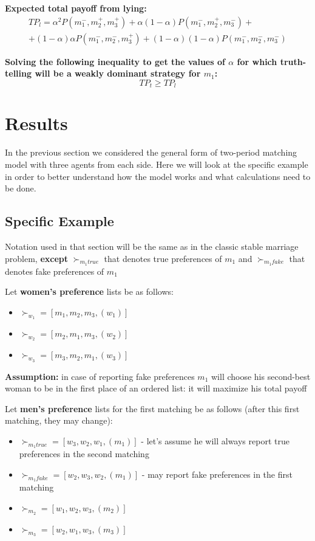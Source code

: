 \documentclass[a4paper]{article} %
\begin{document}
\hfill
\break
\textbf{Expected total payoff from lying:}
\begin{align}
   TP_l = \alpha ^ 2P(m_1^-,m_2^+,m_3^+) + \alpha(1-\alpha)P(m_1^-,m_2^+,m_3^-) + \\  +(1-\alpha)\alpha P(m_1^-,m_2^-,m_3^+) + (1-\alpha)(1-\alpha) P(m_1^-,m_2^-,m_3^-) 
\end{align}

\hfill
\break
\textbf{Solving the following inequality to get the values of $\alpha$ for which truth-telling will be a weakly dominant strategy for $m_1$:}
\[
TP_t \geq TP_l
\]








\section{Results}
In the previous section we considered the general form of two-period matching model with three agents from each side. Here we will look at the specific example in order to better understand how the model works and what calculations need to be done.






\subsection{Specific Example}

Notation used in that section will be the same as in the classic stable marriage problem, \textbf{except} ${\succ_{m_1 true}}$ that denotes true preferences of $m_1$
and ${\succ_{m_1 fake}}$ that denotes fake preferences of $m_1$

\hfill
\break
Let \textbf{women's preference} lists be as follows:
\begin{itemize}
    \item $\succ_{w_1} = [m_1, m_2, m_3, (w_1)]$
    \item $\succ_{w_2} = [m_2, m_1, m_3, (w_2)]$
    \item $\succ_{w_3} = [m_3, m_2, m_1, (w_3)]$
\end{itemize}

\hfill
\break
\textbf{Assumption:} in case of reporting fake preferences $m_1$ will choose his second-best woman to be in the first place of an ordered list: it will maximize his total payoff

\hfill
\break
Let \textbf{men's preference} lists for the first matching be as follows (after this first matching, they may change):
\begin{itemize}
    \item $\succ_{m_1 true} = [w_3, w_2, w_1, (m_1)]$ - let's assume he will always report true preferences in the second matching
    \item $\succ_{m_1 fake} = [w_2, w_3, w_2, (m_1)]$ - may report fake preferences in the first matching
    \item $\succ_{m_2} = [w_1, w_2, w_3, (m_2)]$
    \item $\succ_{m_3} = [w_2, w_1, w_3, (m_3)]$
\end{itemize}
\end{document}
